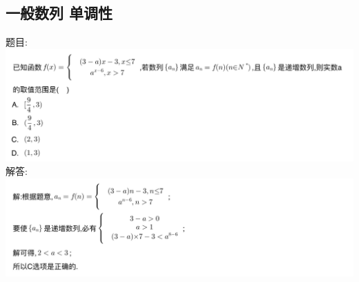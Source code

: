 \documentclass[hyperref, UTF8,11pt,a4paper]{ctexart} %
\begin{document}
\subsection{一般数列 单调性}
{\color{red}  题目: } \\
\includegraphics[width=500pt]  {pic/shulie/fenduanhanshutimu.jpg} \\
解答: \\
\includegraphics[width=500pt]  {pic/shulie/fenduanhanshudaan.jpg} \\
\end{document}
